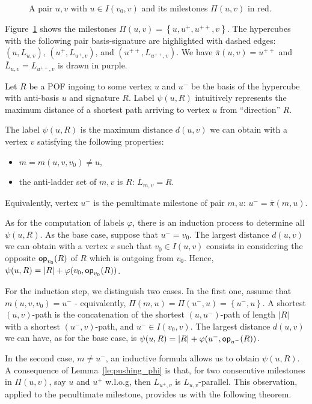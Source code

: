 \documentclass[a4paper,UKenglish,numberwithinsect,cleveref, autoref,anonymous]{lipics-v2021}
\newcommand{\set}[1]{\left\{ #1 \right\}}
\newcommand{\card}[1]{\left| #1 \right|}
\newcommand{\opp}{\mbox{\textsf{op}}}
\begin{document}
\begin{figure}[h]
\centering
\scalebox{0.9}{}
\caption{A pair $u,v$ with $u \in I(v_0,v)$ and its milestones $\Pi(u,v)$ in red.}
\label{fig:milestones}
\end{figure}

Figure~\ref{fig:milestones} shows the milestones $\Pi(u,v) = \set{u,u^+,u^{++},v}$. The hypercubes with the following pair basis-signature are highlighted with dashed edges: $(u,L_{u,v})$, $(u^+,L_{u^+,v})$, and $(u^{++},L_{u^{++},v})$. We have $\overline{\pi}(u,v) = u^{++}$ and $\overline{L}_{u,v} = L_{u^{++},v}$ is drawn in purple.

Let $R$ be a POF ingoing to some vertex $u$ and $u^-$ be the basis of the hypercube with anti-basis $u$ and signature $R$.  Label $\psi(u,R)$ intuitively represents the maximum distance of a shortest path arriving to vertex $u$ from ``direction'' $R$. 

\begin{definition}
The label $\psi(u,R)$ is the maximum distance $d(u,v)$ we can obtain with a vertex $v$ satisfying the following properties:
\begin{itemize}
\item $m = m(u,v,v_0) \neq u$,
\item the anti-ladder set of $m,v$ is $R$: $\overline{L}_{m,v} = R$.
\end{itemize}
Equivalently, vertex $u^-$ is the penultimate milestone of pair $m,u$: $u^- = \overline{\pi}(m,u)$.
\label{def:psi}
\end{definition}

As for the computation of labels $\varphi$, there is an induction process to determine all $\psi(u,R)$. As the base case, suppose that $u^- = v_0$. The largest distance $d(u,v)$ we can obtain with a vertex $v$ such that $v_0 \in I(u,v)$ consists in considering the opposite $\opp_{v_0}(R)$ of $R$ which is outgoing from $v_0$. Hence, $\psi(u,R) = \card{R} + \varphi(v_0,\opp_{v_0}(R))$.

For the induction step, we distinguish two cases. In the first one, assume that $m(u,v,v_0) = u^-$ - equivalently, $\Pi(m,u) = \Pi(u^-,u) = \set{u^-,u}$. A shortest $(u,v)$-path is the concatenation of the shortest $(u,u^-)$-path of length $\card{R}$ with a shortest $(u^-,v)$-path, and $u^- \in I(v_0,v)$. The largest distance $d(u,v)$ we can have, as for the base case, is $\psi(u,R) = \card{R} + \varphi(u^-,\opp_{u^-}(R))$.

In the second case, $m \neq u^-$, an inductive formula allows us to obtain $\psi(u,R)$. A consequence of Lemma~\ref{le:pushing_phi} is that, for two consecutive milestones in $\Pi(u,v)$, say $u$ and $u^+$ w.l.o.g, then $L_{u^+,v}$ is $L_{u,v}$-parallel. This observation, applied to the penultimate milestone, provides us with the following theorem.
\end{document}
